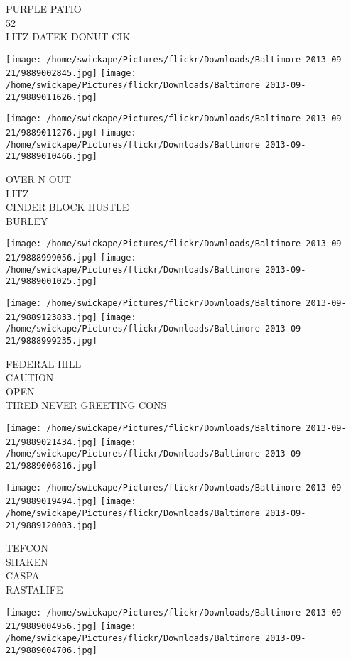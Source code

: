 \documentclass[10pt,letterpaper]{article}
\begin{document}
PURPLE PATIO\\
52\\
LITZ DATEK DONUT CIK
\pagebreak

\texttt{[image: /home/swickape/Pictures/flickr/Downloads/Baltimore 2013-09-21/9889002845.jpg]}
\texttt{[image: /home/swickape/Pictures/flickr/Downloads/Baltimore 2013-09-21/9889011626.jpg]}

\texttt{[image: /home/swickape/Pictures/flickr/Downloads/Baltimore 2013-09-21/9889011276.jpg]}
\texttt{[image: /home/swickape/Pictures/flickr/Downloads/Baltimore 2013-09-21/9889010466.jpg]}

OVER N OUT\\
LITZ\\
CINDER BLOCK HUSTLE\\
BURLEY
\pagebreak

\texttt{[image: /home/swickape/Pictures/flickr/Downloads/Baltimore 2013-09-21/9888999056.jpg]}
\texttt{[image: /home/swickape/Pictures/flickr/Downloads/Baltimore 2013-09-21/9889001025.jpg]}

\texttt{[image: /home/swickape/Pictures/flickr/Downloads/Baltimore 2013-09-21/9889123833.jpg]}
\texttt{[image: /home/swickape/Pictures/flickr/Downloads/Baltimore 2013-09-21/9888999235.jpg]}

FEDERAL HILL\\
CAUTION\\
OPEN\\
TIRED NEVER GREETING CONS
\pagebreak

\texttt{[image: /home/swickape/Pictures/flickr/Downloads/Baltimore 2013-09-21/9889021434.jpg]}
\texttt{[image: /home/swickape/Pictures/flickr/Downloads/Baltimore 2013-09-21/9889006816.jpg]}

\texttt{[image: /home/swickape/Pictures/flickr/Downloads/Baltimore 2013-09-21/9889019494.jpg]}
\texttt{[image: /home/swickape/Pictures/flickr/Downloads/Baltimore 2013-09-21/9889120003.jpg]}

TEFCON\\
SHAKEN\\
CASPA\\
RASTALIFE
\pagebreak

\texttt{[image: /home/swickape/Pictures/flickr/Downloads/Baltimore 2013-09-21/9889004956.jpg]}
\texttt{[image: /home/swickape/Pictures/flickr/Downloads/Baltimore 2013-09-21/9889004706.jpg]}
\end{document}
